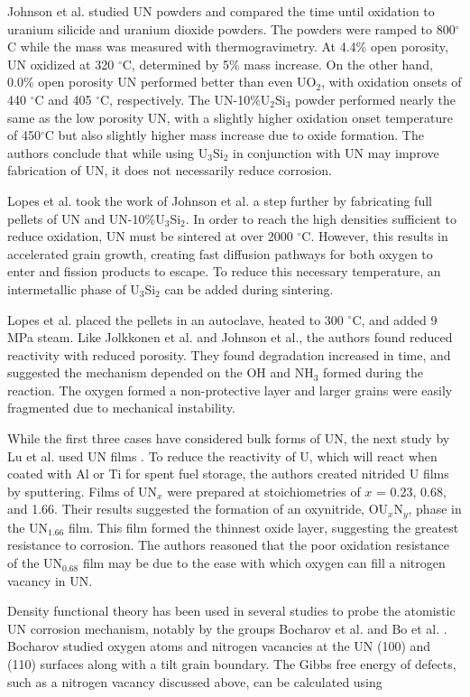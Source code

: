 \documentclass[3p,review,11pt]{elsarticle}
\begin{document}
Johnson et al. \cite{Johnson2016} studied UN powders and compared the time until oxidation to uranium silicide and uranium dioxide powders. The powders were ramped to 800$^{\circ}$C while the mass was measured with thermogravimetry. At 4.4\% open porosity, UN oxidized at 320 $^{\circ}$C, determined by 5\% mass increase. On the other hand, 0.0\% open porosity UN performed better than even UO$_{2}$, with oxidation onsets of 440 $^{\circ}$C and 405 $^{\circ}$C, respectively. The UN-10\%U$_{2}$Si$_{3}$ powder performed nearly the same as the low porosity UN, with a slightly higher oxidation onset temperature of 450$^{\circ}$C but also slightly higher mass increase due to oxide formation. The authors conclude that while using U$_{3}$Si$_{2}$ in conjunction with UN may improve fabrication of UN, it does not necessarily reduce corrosion.
\par 
Lopes et al. \cite{Lopes2017} took the work of Johnson et al. a step further by fabricating full pellets of UN and UN-10\%U$_{3}$Si$_{2}$. In order to reach the high densities sufficient to reduce oxidation, UN must be sintered at over 2000 $^{\circ}$C. However, this results in accelerated grain growth, creating fast diffusion pathways for both oxygen to enter and fission products to escape. To reduce this necessary temperature, an intermetallic phase of U$_{3}$Si$_{2}$ can be added during sintering.
\par 
Lopes et al. placed the pellets in an autoclave, heated to 300 $^{\circ}$C, and added 9 MPa steam. Like Jolkkonen et al. and Johnson et al., the authors found reduced reactivity with reduced porosity. They found degradation increased in time, and suggested the mechanism depended on the OH and NH$_{3}$ formed during the reaction. The oxygen formed a non-protective layer and larger grains were easily fragmented due to mechanical instability.

While the first three cases have considered bulk forms of UN, the next study by Lu et al. used UN films \cite{Lu2016}. To reduce the reactivity of U, which will react when coated with Al or Ti for spent fuel storage, the authors created nitrided U films by sputtering. Films of UN$_{x}$ were prepared at stoichiometries of $x$ = 0.23, 0.68, and 1.66. Their results suggested the formation of an oxynitride, OU$_{x}$N$_{y}$, phase in the UN$_{1.66}$ film. This film formed the thinnest oxide layer, suggesting the greatest resistance to corrosion. The authors reasoned that the poor oxidation resistance of the UN$_{0.68}$ film may be due to the ease with which oxygen can fill a nitrogen vacancy in UN.
\par 
Density functional theory has been used in several studies to probe the atomistic UN corrosion mechanism, notably by the groups Bocharov et al. \cite{Bocharov2013} and Bo et al. \cite{Bo2016}. Bocharov studied oxygen atoms and nitrogen vacancies at the UN (100) and (110) surfaces along with a tilt grain boundary. The Gibbs free energy of defects, such as a nitrogen vacancy discussed above, can be calculated using
\end{document}
